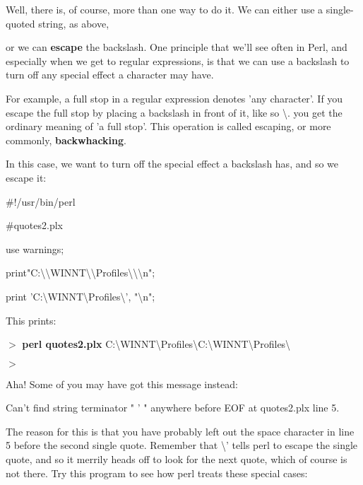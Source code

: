 \documentclass[a4paper,11pt]{book}
\begin{document}
\noindent 

\noindent Well, there is, of course, more than one way to do it. We can either use a single-quoted string, as above,

\noindent or we can \textbf{escape }the backslash. One principle that we'll see often in Perl, and especially when we get to regular expressions, is that we can use a backslash to turn off any special effect a character may have.

\noindent For example, a full stop in a regular expression denotes 'any character'. If you escape the full stop by placing a backslash in front of it, like so \textbackslash . you get the ordinary meaning of 'a full stop'. This operation is called escaping, or more commonly, \textbf{backwhacking}.

\noindent 

\noindent In this case, we want to turn off the special effect a backslash has, and so we escape it:

\noindent 

\noindent \#!/usr/bin/perl

\noindent \#quotes2.plx

\noindent use warnings;

\noindent print"C:\textbackslash \textbackslash WINNT\textbackslash \textbackslash Profiles\textbackslash \textbackslash \textbackslash n";

\noindent print 'C:\textbackslash WINNT\textbackslash Profiles\textbackslash  ', "\textbackslash n";

\noindent 

\noindent This prints:

\noindent 

\noindent $>$ \textbf{perl quotes2.plx }C:\textbackslash WINNT\textbackslash Profiles\textbackslash  C:\textbackslash WINNT\textbackslash Profiles\textbackslash 

\noindent $>$

\noindent 

\noindent Aha! Some of you may have got this message instead:

\noindent 

\noindent Can't find string terminator " ' " anywhere before EOF at quotes2.plx line 5.

\noindent 

\noindent The reason for this is that you have probably left out the space character in line 5 before the second single quote. Remember that  \textbackslash ' tells perl to escape the single quote, and so it merrily heads off to look for the next quote, which of course is not there. Try this program to see how perl treats these special cases:
\end{document}
